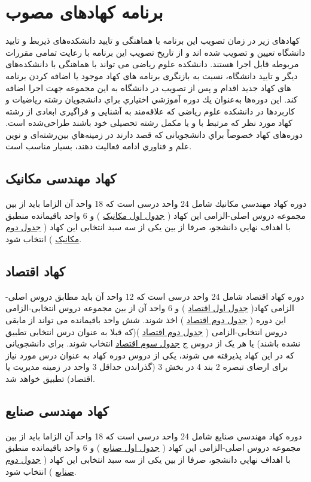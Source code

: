 \documentclass{article}
\begin{document}
\section{برنامه کهادهای مصوب}
کهادهای زیر در زمان تصویب این برنامه با هماهنگی و تایید دانشکده‌های ذیربط و تایید دانشگاه تعیین و تصویب شده اند و از تاریخ تصویب این برنامه با رعایت تمامی مقررات مربوطه قابل اجرا هستند. دانشکده علوم ریاضی می تواند با هماهنگی با دانشکده‌های دیگر و تایید دانشگاه، نسبت به بازنگری برنامه های کهاد موجود یا اضافه کردن برنامه های کهاد جدید اقدام و پس از تصویب در دانشگاه به این مجموعه جهت اجرا اضافه کند.
این دوره‌ها به‌عنوان يك دوره آموزشي اختياري براي دانشجويان رشته ریاضیات و کاربردها در دانشكده علوم ریاضی كه علاقه‌مند به آشنایی و فراگیری ابعادی از رشته کهاد مورد نظر که مرتبط با و یا مکمل رشته تحصیلی خود ‌باشند طراحی‌شده است. دوره‌های کهاد خصوصاً براي دانشجویانی كه قصد دارند در زمینه‌هاي بین‌رشته‌ای و نوين علم و فناوري ادامه فعالیت دهند، بسيار مناسب است.



\subsection{
کهاد مهندسی مکانیک
}
دوره کهاد مهندسي مكانيك شامل 24 واحد درسی است که 18 واحد آن الزاما باید از بین مجموعه دروس اصلی-الزامی این کهاد (
\href{mech-t1}{جدول اول مکانیک}
) و 6 واحد باقیمانده منطبق با اهداف نهايي دانشجو، صرفا از بین یکی از سه سبد انتخابی این کهاد (
\href{mech-t2}{جدول دوم مکانیک}
) انتخاب شود.
\subsection{
کهاد اقتصاد
}
دوره کهاد اقتصاد شامل 24 واحد درسی است که  12 واحد آن باید مطابق دروس اصلی-الزامی کهاد(
\href{eco-t1}{جدول اول اقتصاد}
) و 6 واحد آن از بین مجموعه دروس انتخابی-الزامی این دوره (
 \href{eco-t2}{جدول دوم اقتصاد}
 ) اخذ شوند. شش واحد باقیمانده می تواند از مابقی دروس انتخابی-الزامی (
  \href{eco-t2}{جدول دوم اقتصاد}
 )(که قبلا به عنوان درس انتخابی تطبیق نشده باشند) یا هر یک از دروس ج
  \href{eco-t3}{جدول سوم اقتصاد}
 انتخاب شوند. برای دانشجویانی که در این کهاد پذیرفته می شوند، یکی از دروس دوره کهاد به عنوان درس مورد نیاز برای ارضای تبصره 2 بند 4 در بخش 3 (گذراندن حداقل 3 واحد در زمینه مدیریت یا اقتصاد) تطبیق خواهد شد.
\subsection{
کهاد مهندسی صنایع
}
دوره کهاد مهندسي صنایع شامل 24 واحد درسی است که 18 واحد آن الزاما باید از بین مجموعه دروس اصلی-الزامی این کهاد (
\href{ind-t1}{جدول اول صنایع}
) و 6 واحد باقیمانده منطبق با اهداف نهايي دانشجو، صرفا از بین یکی از سه سبد انتخابی این کهاد (
\href{ind-t2}{جدول دوم صنایع}
) انتخاب شود.
\end{document}
